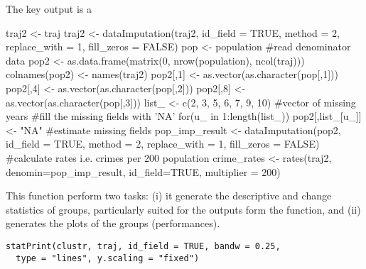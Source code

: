 \documentclass[a4paper]{book}
\begin{document}
%
\begin{Value}
The key output is a
\end{Value}
%
\begin{Examples}
\begin{ExampleCode}
traj2 <- traj
traj2 <- dataImputation(traj2, id_field = TRUE, method = 2, replace_with = 1, fill_zeros = FALSE)
pop <- population #read denominator data
pop2 <- as.data.frame(matrix(0, nrow(population), ncol(traj)))
colnames(pop2) <- names(traj2)
pop2[,1] <- as.vector(as.character(pop[,1]))
pop2[,4] <- as.vector(as.character(pop[,2]))
pop2[,8] <- as.vector(as.character(pop[,3]))
list_ <- c(2, 3, 5, 6, 7, 9, 10) #vector of missing years
#fill the missing fields with 'NA'
for(u_ in 1:length(list_)){
    pop2[,list_[u_]] <- "NA"
}
#estimate missing fields
pop_imp_result <- dataImputation(pop2, id_field = TRUE, method = 2, replace_with = 1, fill_zeros = FALSE)
#calculate rates i.e. crimes per 200 population
crime_rates <- rates(traj2, denomin=pop_imp_result, id_field=TRUE, multiplier = 200)
\end{ExampleCode}
\end{Examples}
%
\begin{Description}\relax
This function perform two tasks: (i) it generate the descriptive and change statistics of groups, particularly suited for the outputs form the  function, and (ii) generates the plots of the groups (performances).
\end{Description}
%
\begin{Usage}
\begin{verbatim}
statPrint(clustr, traj, id_field = TRUE, bandw = 0.25,
  type = "lines", y.scaling = "fixed")
\end{verbatim}
\end{Usage}
%
\end{document}

